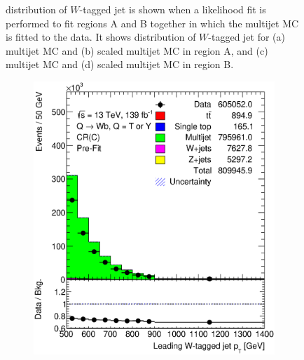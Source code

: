 \begin{figure}[hbt!]
\begin{subfigure}{.35\textwidth}
		\caption{}
	\end{subfigure}
	\caption{\pt distribution of $W$-tagged jet is shown when a likelihood fit is performed to fit regions A and B together in which the multijet MC is fitted to the data. It shows \pt distribution of $W$-tagged jet for (a) multijet MC and (b) scaled multijet MC in region A, and (c) multijet MC and (d) scaled multijet MC in region B.}
	\label{fig:app:ab:ljetpt}
\end{figure}



\begin{figure}[hbt!]
	\centering
	\graphicspath{{figs/appendix/scaledmultijet/CDljetpt/}}
	\begin{subfigure}{.35\textwidth}
		\centering
		\includegraphics[width=\linewidth,height=\textheight,keepaspectratio]{CR_C_ljet_pt.eps}
		\caption{}
	\end{subfigure}\hspace{0.6cm}
	\begin{subfigure}{.35\textwidth}
		\centering

\end{subfigure}
\end{figure}

